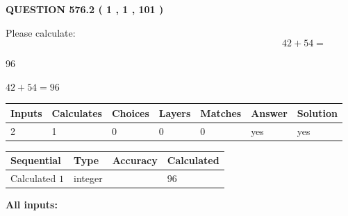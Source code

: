 \documentclass[12pt]{article}
\begin{document}
{\textbf{\Large{QUESTION
576.2 
 ( 1 , 1 , 101 )
}}}
  
  
 
Please calculate:
\begin{equation}
42 +  %
54 = \nonumber
\end{equation}
 
 
 
\noindent{}
 
 

96
 
 
\noindent{}
 
 

 
 
 
\noindent{}
 
 

$ %
42 +  %
54=   %
96$
 
 
\noindent{}
 
 

 
   
   
   
   
\noindent\begin{tabular}{|l|l|l|l|l|l|l|}
 \hline
Inputs & Calculates & Choices & Layers & Matches & Answer & Solution \\ \hline
 2  & 
 1  & 
 0
  & 
 0  & 
 0  & 
  yes & 
  yes 
  \\ \hline
 \end{tabular}
   
   
   
   
\noindent{}
   
   
  
  
\noindent\begin{tabular}{|l|l|l|l|}
\hline
 Sequential & Type & Accuracy & Calculated \\ 
\hline
 
 
  Calculated $  1 $ & integer &  & 
  $ 96 $ 
 \\  \hline  
 \end{tabular}
   
   
   
   
\noindent\vspace{0.1in}\hspace{-0.08in} {\textbf{\Large{All inputs: }}}
   
\end{document}
